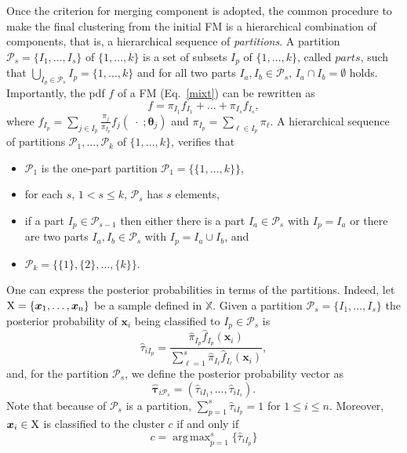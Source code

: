 \documentclass[10pt, a4paper]{article}
\DeclareMathOperator*{\argmax}{arg\,max}
\newcommand{\m}[1]{\boldsymbol{#1}}
\begin{document}
\begin{spacing}{1.9}
Once the criterion for merging component is adopted, the common procedure to make the final clustering from the initial FM is a hierarchical combination of components, that is, a hierarchical sequence of \emph{partitions}. A partition $\mathcal{P}_s=\{ I_1, \dots, I_s\}$ of $\{1, \dots, k\}$ is a set of subsets $I_p$ of $\{1, \dots, k\}$, called $parts$, such that $\bigcup_{I_p \in \mathcal{P}_s} I_p = \{1, \dots, k\}$ and for all two parts $I_a, I_b \in \mathcal{P}_s$, $I_a \cap I_b = \emptyset$ holds. Importantly, the pdf $f$ of a FM (Eq.~\ref{mixt}) can be rewritten as
\begin{equation}
f = \pi_{I_1} f_{I_1} + \dots + \pi_{I_s} f_{I_s},
\label{mixt_part}
\end{equation}
where $f_{I_p} = \sum_{j \in I_p} \frac{\pi_j}{\pi_{I_p}} f_j(\;\cdot\; ; \m\theta_j)$ and $\pi_{I_p} = \sum_{\ell \in I_p} \pi_\ell$. A hierarchical sequence of partitions $\mathcal{P}_1, \dots, \mathcal{P}_k$ of $\{1,...,k\}$, verifies that
  
\begin{itemize}
\item $\mathcal{P}_1$ is the one-part partition $\mathcal{P}_1 = \{ \{1, \dots, k\} \}$,
\item for each $s$, $1 <  s \leq k$, $\mathcal{P}_{s}$ has $s$ elements,
\item if a part $I_p \in \mathcal{P}_{s-1}$ then either there is a part $I_a \in \mathcal{P}_{s}$ with $I_p = I_a$ or there are two parts $I_a, I_b \in \mathcal{P}_s$ with $I_p = I_a \cup I_b$, and
\item $\mathcal{P}_k= \{ \{1\},\{2\}, \dots, \{k\} \}$.
\end{itemize}

One can express the posterior probabilities in terms of the partitions. Indeed, let $\rm X = \{\m x_1,\dots, \m x_n\}$ be a sample defined in $\mathbb{X}$. Given a partition $\mathcal{P}_s = \{ I_1, \dots, I_s \}$ the posterior probability of $\m x_i$ being classified to $I_p\in \mathcal{P}_{s}$ is
\[
\hat{\tau}_{i I_p} =  \frac{ \hat{\pi}_{I_p} \hat{f}_{I_p}(\m x_i) }{\sum_{\ell=1}^s \hat{\pi}_{I_\ell} \hat{f}_{I_\ell}(\m x_i)},
\]
and, for the partition  $\mathcal{P}_s$, we define the posterior probability vector as
\[
\hat{\m\tau}_{i \mathcal{P}_s} = \left( \hat{\tau}_{i I_1} , \dots, \hat{\tau}_{i I_s}  \right).
\]
Note that because of $\mathcal{P}_s$ is a partition, $\sum_{p=1}^s \hat{\tau}_{i I_p} = 1$ for $1 \leq i \leq n$.
Moreover, $\m x_i \in \rm X$ is classified to the cluster $c$ if and only if
\begin{equation}\label{cluster_criteria}
c= \argmax_{p=1}^s \{ \hat{\tau}_{i I_p} \}
\end{equation}



\end{spacing}
\end{document}

